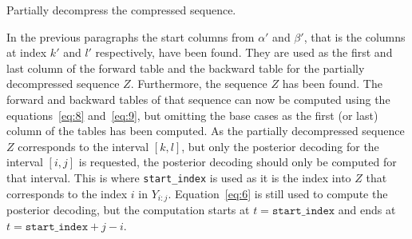 \begin{algorithm}
  \caption{Partially decompress the compressed sequence.}
  \label{alg:decompress}
  \begin{algorithmic}[1]
            \State{next\_index $\gets$ index + $M_{sl}(c)$]}
                 
                    \EndIf{}
                \Else{}
                     
                \EndIf{}
                 
            \EndIf{}
             
        \EndWhile{}
    \EndProcedure{}
  \end{algorithmic}
\end{algorithm}

In the previous paragraphs the start columns from $\alpha'$ and $\beta'$, that
is the columns at index $k'$ and $l'$ respectively, have been found. They are
used as the first and last column of the forward table and the backward table for
the partially decompressed sequence $Z$. Furthermore, the sequence $Z$ has
been found. The forward and backward tables of that sequence can now be
computed using the equations~\eqref{eq:8} and~\eqref{eq:9}, but omitting
the base cases as the first (or last) column of the tables has been
computed. As the partially decompressed sequence $Z$ corresponds to the
interval $[k, l]$, but only the posterior decoding for the interval $[i, j]$ is
requested, the posterior decoding should only be computed for that interval.
This is where \texttt{start\_index} is used as it is the index into $Z$
that corresponds to the index $i$ in $Y_{i:j}$. Equation~\eqref{eq:6}
is still used to compute the posterior decoding, but the computation starts at
$t = \mathtt{start\_index}$ and ends at $t = \mathtt{start\_index} + j - i$.

